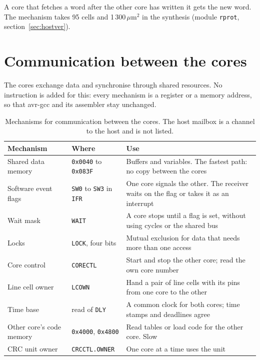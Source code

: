 \documentclass[10pt,a4paper]{article}
\newcommand{\reg}[1]{\texttt{#1}}
\begin{document}
A core that fetches a word after the other core has written it gets the new word. The mechanism
takes 95 cells and 1\,300\,$\mu$m$^2$ in the synthesis (module \texttt{rprot}, section~\ref{sec:hostver}).

\section{Communication between the cores}\label{sec:comm}

The cores exchange data and synchronise through shared resources. No instruction is added for this: every
mechanism is a register or a memory address, so that avr-gcc and its assembler stay unchanged.

\begin{table}[H]
\centering\small
\begin{tabularx}{\linewidth}{@{}>{\raggedright\arraybackslash}p{33mm}>{\raggedright\arraybackslash}p{38mm}L@{}}
\toprule
Mechanism & Where & Use \\
\midrule
Shared data memory & \texttt{0x0040} to \texttt{0x083F} & Buffers and variables. The fastest path: no copy between the cores \\
Software event flags & \reg{SW0} to \reg{SW3} in \reg{IFR} & One core signals the other. The receiver waits on the flag or takes it as an interrupt \\
Wait mask & \reg{WAIT} & A core stops until a flag is set, without using cycles or the shared bus \\
Locks & \reg{LOCK}, four bits & Mutual exclusion for data that needs more than one access \\
Core control & \reg{CORECTL} & Start and stop the other core; read the own core number \\
Line cell owner & \reg{LCOWN} & Hand a pair of line cells with its pins from one core to the other \\
Time base & read of \reg{DLY} & A common clock for both cores; time stamps and deadlines agree \\
Other core's code memory & \texttt{0x4000}, \texttt{0x4800} & Read tables or load code for the other core. Slow \\
CRC unit owner & \reg{CRCCTL.OWNER} & One core at a time uses the unit \\
\bottomrule
\end{tabularx}
\caption{Mechanisms for communication between the cores. The host mailbox is a channel to the host and is not
listed.}
\end{table}
\end{document}
